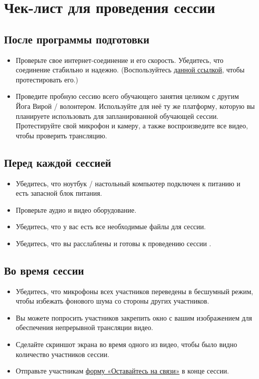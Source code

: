 \newpage
\section*{Чек-лист для проведения сессии}
\label{sec:online}

\subsection*{После программы подготовки}
\begin{itemize}
\item Проверьте свое интернет-соединение и его скорость. Убедитесь, что соединение стабильно и надежно. (Воспользуйтесь \href{https://www.speedtest.net}{данной ссылкой}, чтобы протестировать его.)

\item Проведите пробную сессию всего обучающего занятия целиком с другим Йога Вирой / волонтером. Используйте для неё ту же платформу, которую вы планируете использовать для запланированной обучающей сессии. Протестируйте свой микрофон и камеру, а также воспроизведите все видео, чтобы проверить трансляцию.

\end{itemize}

\subsection*{Перед каждой сессией}
\begin{itemize}
\item Убедитесь, что ноутбук / настольный компьютер подключен к питанию и есть запасной блок питания.
\item Проверьте аудио и видео оборудование.
\item Убедитесь, что у вас есть все необходимые файлы для сессии.
\item Убедитесь, что вы расслаблены и готовы к проведению сессии \faSmileO.
\end{itemize}
\subsection*{Во время сессии}
\begin{itemize}
\item Убедитесь, что микрофоны всех участников переведены в бесшумный режим, чтобы избежать фонового шума со стороны других участников.

\item Вы можете попросить участников закрепить окно с вашим изображением для обеспечения непрерывной трансляции видео.

\item Сделайте скриншот экрана во время одного из видео, чтобы было видно количество участников сессии.

\item Отправьте участникам \href{https://forms.gle/oxQNwrThpZ5bxwFm8}{форму «Оставайтесь на связи»} в конце сессии. 
\end{itemize}


